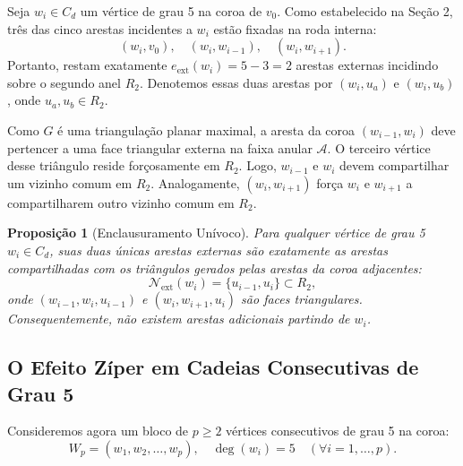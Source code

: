 \documentclass[11pt,a4paper]{article}
\theoremstyle{plain}
\newtheorem{proposition}[theorem]{Proposição}
\theoremstyle{definition}
\begin{document}
Seja $w_i \in C_d$ um vértice de grau 5 na coroa de $v_0$. Como estabelecido na Seção 2, três das cinco arestas incidentes a $w_i$ estão fixadas na roda interna:
\begin{equation}
(w_i, v_0), \quad (w_i, w_{i-1}), \quad (w_i, w_{i+1}).
\end{equation}
Portanto, restam exatamente $e_{\text{ext}}(w_i) = 5 - 3 = 2$ arestas externas incidindo sobre o segundo anel $R_2$. Denotemos essas duas arestas por $(w_i, u_a)$ e $(w_i, u_b)$, onde $u_a, u_b \in R_2$.

Como $G$ é uma triangulação planar maximal, a aresta da coroa $(w_{i-1}, w_i)$ deve pertencer a uma face triangular externa na faixa anular $\mathcal{A}$. O terceiro vértice desse triângulo reside forçosamente em $R_2$. Logo, $w_{i-1}$ e $w_i$ devem compartilhar um vizinho comum em $R_2$. Analogamente, $(w_i, w_{i+1})$ força $w_i$ e $w_{i+1}$ a compartilharem outro vizinho comum em $R_2$. 

\begin{proposition}[Enclausuramento Unívoco]
Para qualquer vértice de grau 5 $w_i \in C_d$, suas duas únicas arestas externas são exatamente as arestas compartilhadas com os triângulos gerados pelas arestas da coroa adjacentes:
\begin{equation}
\mathcal{N}_{\text{ext}}(w_i) = \{u_{i-1}, u_i\} \subset R_2,
\end{equation}
onde $(w_{i-1}, w_i, u_{i-1})$ e $(w_i, w_{i+1}, u_i)$ são faces triangulares. Consequentemente, não existem arestas adicionais partindo de $w_i$.
\end{proposition}

\subsection{O Efeito Zíper em Cadeias Consecutivas de Grau 5}

Consideremos agora um bloco de $p \ge 2$ vértices consecutivos de grau 5 na coroa:
\begin{equation}
W_p = (w_1, w_2, \dots, w_p), \quad \deg(w_i) = 5 \quad (\forall i = 1, \dots, p).
\end{equation}
\end{document}
